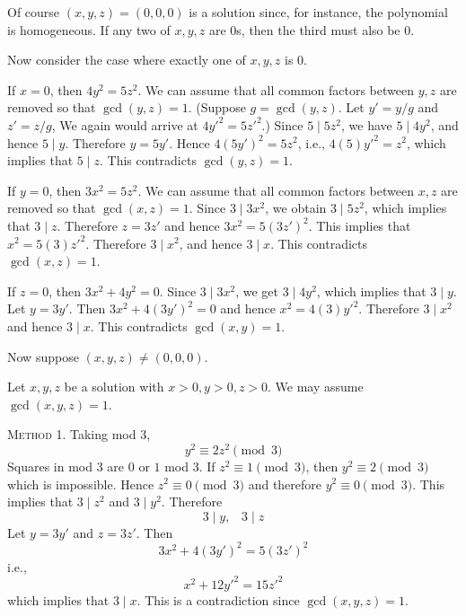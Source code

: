 

    
Of course $(x,y,z) = (0,0,0)$ is a solution since, for instance, the polynomial is
homogeneous.
If any two of $x,y,z$ are 0s, then the third must also be 0.

Now consider the case where exactly one of $x,y,z$ is 0.
\begin{myenum}
\item
  If $x = 0$, then $4y^2 = 5z^2$.
  We can assume that all common factors between $y,z$ are removed so that
  $\gcd(y,z) = 1$.
  (Suppose $g = \gcd(y, z)$. Let $y' = y/g$ and $z' = z/g$,
  We again would arrive at $4y'^2 = 5z'^2$.)
  Since $5 \mid 5z^2$, we have $5 \mid 4y^2$, and hence $5 \mid y$.
  Therefore $y = 5y'$.
  Hence $4(5y')^2 = 5z^2$, i.e.,
  $4(5)y'^2 = z^2$, which implies that $5 \mid z$.
  This contradicts $\gcd(y, z) = 1$.

\item
  If $y = 0$, then $3 x^2 = 5 z^2$.
  We can assume that all common factors between $x,z$ are removed so that $\gcd(x, z) = 1$.
  Since $3 \mid 3 x^2$,
  we obtain $3 \mid 5z^2$, which implies that $3 \mid z$.
  Therefore $z = 3z'$ and hence $3x^2 = 5(3z')^2$.
  This implies that $x^2 = 5(3)z'^2$.
  Therefore $3 \mid x^2$, and hence $3 \mid x$.
  This contradicts $\gcd(x, z) = 1$.
  
\item
  If $z = 0$, then $3x^2 + 4y^2 = 0$.
  Since $3 \mid 3 x^2$, we get $3 \mid 4 y^2$,
  which implies that $3 \mid y$.
  Let $y = 3y'$.
  Then $3x^2 + 4(3y')^2 = 0$ and hence $x^2 = 4(3)y'^2$.
  Therefore $3 \mid x^2$ and hence $3 \mid x$.
  This contradicts $\gcd(x, y) = 1$.
\end{myenum}

Now suppose $(x, y, z) \neq (0,0,0)$.

Let $x,y,z$ be a solution with $x > 0, y > 0, z > 0$.
We may assume $\gcd(x,y,z) = 1$.

\textsc{Method 1.}
Taking mod 3,
\[
  y^2 \equiv 2 z^2 \pmod{3}
\]
Squares in mod 3 are $0$ or $1$ mod 3.
If $z^2 \equiv 1 \pmod{3}$, then $y^2 \equiv 2 \pmod{3}$
which is impossible.
Hence $z^2 \equiv 0 \pmod{3}$ and therefore $y^2 \equiv 0 \pmod{3}$.
This implies that $3 \mid z^2$ and $3 \mid y^2$.
Therefore
\[
  3 \mid y, \,\,\,\,\, 3 \mid z
\]
Let $y = 3y'$ and $z = 3z'$.
Then
\[
3x^2 + 4(3y')^2 = 5(3z')^2  
\]
i.e.,
\[
x^2 + 12y'^2 = 15z'^2  
\]
which implies that $3 \mid x$.
This is a contradiction since $\gcd(x, y, z) = 1$.


